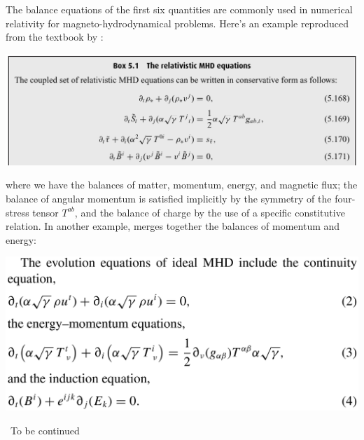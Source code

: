 \documentclass[a4paper,12pt,%
onecolumn,oneside,%
british%
]{memoir}
\newcommand{\mynotew}[1]{{\footnotesize\color{midgrey}\faIcon{tools}\ #1}}
\renewcommand*{\|}[1][]{\nonscript\:#1\vert\nonscript\:\mathopen{}}
\begin{document}
The balance equations of the first six quantities are commonly used in numerical relativity for magneto-hydrodynamical problems. Here's an example reproduced from the textbook by \cites{baumgarteetal2010}:
\begin{center}
  \includegraphics[width=\linewidth]{images/baumgartebox.jpg}%
\end{center}
where we have the balances of matter, momentum, energy, and magnetic flux; %
the balance of angular momentum is satisfied implicitly by the symmetry of the four-stress tensor $T^{ab}$, and the balance of charge by the use of a specific constitutive relation. In another example, \cites{komissarov2005} merges together the balances of momentum and energy:
\begin{center}
  \includegraphics[width=0.75\linewidth]{images/komissarov.png}%
\end{center}

\mynotew{To be continued}


\end{document}
